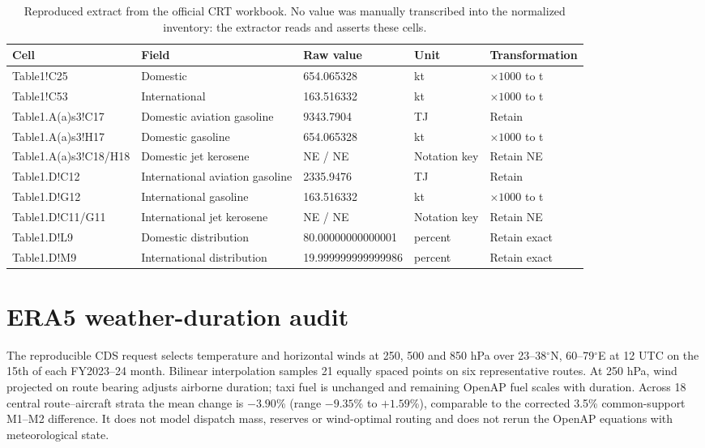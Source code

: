 \documentclass[5p,times,authoryear]{elsarticle}
\begin{document}
\begin{table}[htbp]
\centering
\scriptsize
\begin{tabular}{@{}lllll@{}}
\toprule
\textbf{Cell} & \textbf{Field} & \textbf{Raw value} & \textbf{Unit} & \textbf{Transformation} \\
\midrule
Table1!C25 & Domestic \COtwo{} & 654.065328 & kt \COtwo{} & $\times1000$ to t \\
Table1!C53 & International \COtwo{} & 163.516332 & kt \COtwo{} & $\times1000$ to t \\
Table1.A(a)s3!C17 & Domestic aviation gasoline & 9343.7904 & TJ & Retain \\
Table1.A(a)s3!H17 & Domestic gasoline \COtwo{} & 654.065328 & kt \COtwo{} & $\times1000$ to t \\
Table1.A(a)s3!C18/H18 & Domestic jet kerosene & NE / NE & Notation key & Retain NE \\
Table1.D!C12 & International aviation gasoline & 2335.9476 & TJ & Retain \\
Table1.D!G12 & International gasoline \COtwo{} & 163.516332 & kt \COtwo{} & $\times1000$ to t \\
Table1.D!C11/G11 & International jet kerosene & NE / NE & Notation key & Retain NE \\
Table1.D!L9 & Domestic distribution & 80.00000000000001 & percent & Retain exact \\
Table1.D!M9 & International distribution & 19.999999999999986 & percent & Retain exact \\
\bottomrule
\end{tabular}
\caption{Reproduced extract from the official CRT workbook. No value was manually transcribed
into the normalized inventory: the extractor reads and asserts these cells.}
\label{tab:crt-extract}
\end{table}

\section{ERA5 weather-duration audit}

The reproducible CDS request selects temperature and horizontal winds at 250, 500 and 850 hPa
over 23--38$^\circ$N, 60--79$^\circ$E at 12 UTC on the 15th of each FY2023--24
month. Bilinear interpolation samples 21 equally spaced points on six representative routes.
At 250 hPa, wind projected on route bearing adjusts airborne duration; taxi fuel is unchanged
and remaining OpenAP fuel scales with duration. Across 18 central route--aircraft strata the
mean change is $-3.90$\% (range $-9.35$\% to $+1.59$\%), comparable to the corrected 3.5\%
common-support M1--M2 difference. It does not model dispatch mass, reserves or wind-optimal
routing and does not rerun the OpenAP equations with meteorological state.
\end{document}

